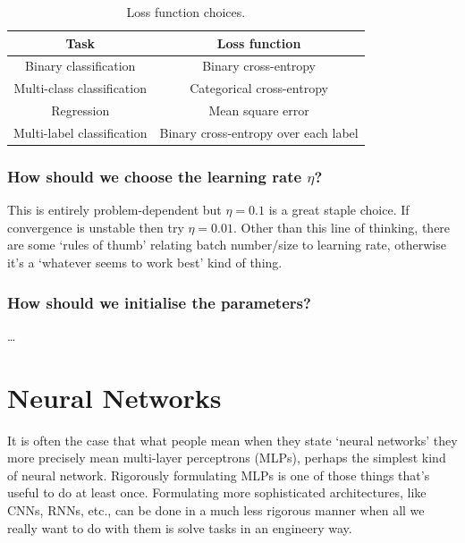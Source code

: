 \documentclass[11pt]{article}
\begin{document}
\begin{table}[ht]
    \begin{center}
        \begin{tabular}{c||c}
            \textbf{Task} & \textbf{Loss function}\\
            \hline
            \hline
            Binary classification & Binary cross-entropy\\
            Multi-class classification & Categorical cross-entropy\\
            Regression & Mean square error\\
            Multi-label classification & Binary cross-entropy over each label\\
            \hline
        \end{tabular}
    \end{center}
    \vspace{-15pt}
    \caption{\centering Loss function choices.}
    \label{tab:loss_func_choices}
\end{table}

\subsubsection{How should we choose the learning rate $\eta$?}
This is entirely problem-dependent but $\eta=0.1$ is a great staple choice. If convergence is unstable then try $\eta=0.01$. Other than this line of thinking, there are some `rules of thumb' relating batch number/size to learning rate, otherwise it's a `whatever seems to work best' kind of thing.

\subsubsection{How should we initialise the parameters?}
\dots

\newpage
\section{Neural Networks}
It is often the case that what people mean when they state `neural networks' they more precisely mean multi-layer perceptrons (MLPs), perhaps the simplest kind of neural network. Rigorously formulating MLPs is one of those things that's useful to do at least once. Formulating more sophisticated architectures, like CNNs, RNNs, etc., can be done in a much less rigorous manner when all we really want to do with them is solve tasks in an engineery way.
\end{document}
